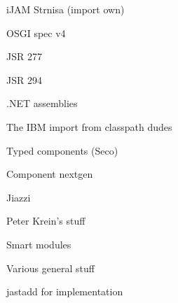 iJAM Strnisa (import own) \cite{iJAM}

OSGI spec v4 \cite{OSGi4}

JSR 277 \cite{JSR277}

JSR 294 \cite{JSR294}

.NET assemblies \cite{netassemblies}

The IBM import from classpath dudes \cite{corwinMJModules}

Typed components (Seco) \cite{secotypedcomponents}

Component nextgen \cite{componentnextgen}

Jiazzi \cite{mcdirmid01jiazzi}


Peter Krein's stuff \cite{iJAMComments} \cite{superpackagesNoMore}

Smart modules \cite{Ancona05smartmodules}

Various general stuff \cite{hoffman90moduleinterfaces} \cite{szyperski92import}

jastadd for implementation \cite{jastadd}